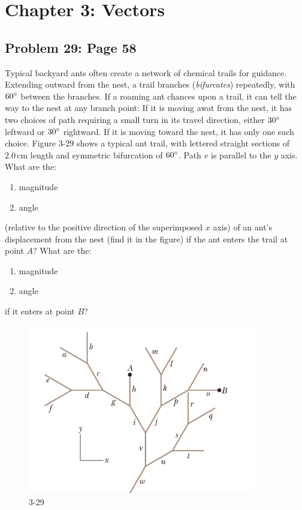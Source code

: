 \documentclass{article}
\begin{document}
\begin{subequations}
    \end{subequations}

\newpage

\section{Chapter 3: Vectors}

    \subsection{Problem 29: Page 58}
    Typical backyard ants often create a network of chemical 
    trails for guidance. Extending outward from the nest, a trail
    branches (\textit{bifurcates}) repeatedly, with $60\degree$
    between the branches. If a roaming ant chances upon a trail, it 
    can tell the way to the nest at any branch point: If it is moving 
    awat from the nest, it has two choices of path requiring a small turn 
    in its travel direction, either $30\degree$ leftward or $30\degree$
    rightward. If it is moving toward the nest, it has only one such choice. 
    Figure 3-29 shows a typical ant trail, with lettered straight sections
    of $2.0\,\mathrm{cm}$ length and symmetric bifurcation of $60\degree$.
    Path $v$ is parallel to the $y$ axis. What are the:
    \begin{enumerate}[label=(\alph*)]
        \item magnitude
        \item angle
    \end{enumerate}
    (relative to the positive direction of the superimposed $x$ axis) of 
    an ant's displacement from the nest (find it in the figure) if the ant 
    enters the trail at point $A$? What are the:
    \begin{enumerate}[label=(\alph*), start=3]
        \item magnitude
        \item angle
    \end{enumerate}
    if it enters at point $B$?
    \begin{figure}[h!]
       \centering 
       \includegraphics[width=10cm]{Exam1Practice_Figures/vector.png}
       \caption{3-29}
    \end{figure}
\end{document}
